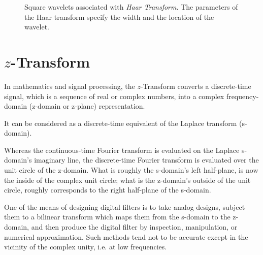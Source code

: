 \documentclass[\documentfontsize, twocolumn]{\classname}
\begin{document}
\begin{figure*}[ht]
\begin{center}
    \end{center}\caption{Square wavelets associated with \emph{Haar Transform}. The parameters of the Haar transform specify the width and the location of the wavelet.}\label{tikz:haarTransformWavelets}
\end{figure*}

\chapter{$z$-Transform}\label{sec:zTransform}

In mathematics and signal processing, the $z$-Transform converts a discrete-time signal, which is a sequence of real or complex numbers, into a complex frequency-domain (z-domain or z-plane) representation.

It can be considered as a discrete-time equivalent of the Laplace transform (s-domain).

Whereas the continuous-time Fourier transform is evaluated on the Laplace s-domain's imaginary line, the discrete-time Fourier transform is evaluated over the unit circle of the z-domain. What is roughly the s-domain's left half-plane, is now the inside of the complex unit circle; what is the z-domain's outside of the unit circle, roughly corresponds to the right half-plane of the s-domain.

One of the means of designing digital filters is to take analog designs, subject them to a bilinear transform which maps them from the s-domain to the z-domain, and then produce the digital filter by inspection, manipulation, or numerical approximation. Such methods tend not to be accurate except in the vicinity of the complex unity, i.e. at low fre\-quen\-cies\cite{bib:zTransform}.
\end{document}
